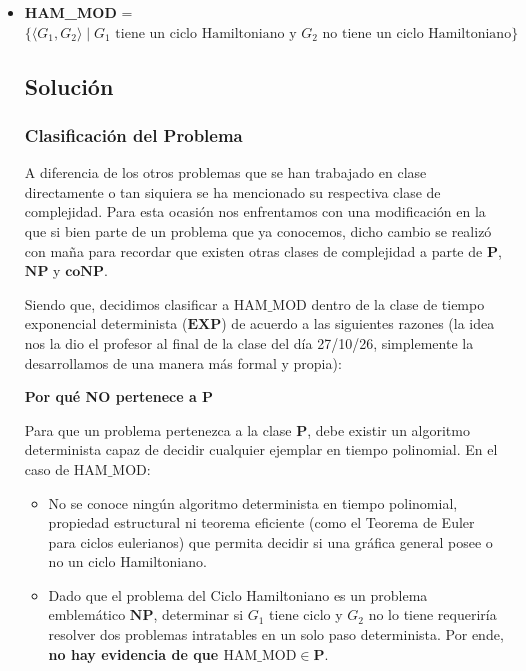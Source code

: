 \begin{itemize}[leftmargin=*]
    Como $L \in \mathbf{P}$, se puede usar el algoritmo determinista $M$ como un verificador trivial que ignora cualquier certificado, lo que demuestra que \textbf{$L \in \mathbf{NP}$}.

    Por otra parte, al ser $\mathbf{P}$ cerrada bajo complemento ($\mathbf{P} = \text{co}\mathbf{P}$), el complemento de $L$ también está en $\mathbf{P}$, lo que implica directamente que \textbf{$L \in \mathbf{coNP}$}.

    \vspace{0.5cm}
    \item \textbf{HAM\_MOD} = $\{ \langle G_1, G_2 \rangle \mid G_1 \text{ tiene un ciclo Hamiltoniano y } G_2 \text{ no tiene un ciclo Hamiltoniano} \}$
    
    \subsection*{Solución}
    \subsubsection*{Clasificación del Problema}

    A diferencia de los otros problemas que se han trabajado en clase directamente o tan siquiera se ha mencionado su respectiva clase de complejidad. Para esta ocasión nos enfrentamos con una modificación en la que si bien parte de un problema que ya conocemos, dicho cambio se realizó con maña para recordar que existen otras clases de complejidad a parte de $\mathbf{P}$, $\mathbf{NP}$ y $\mathbf{coNP}$.

    Siendo que, decidimos clasificar a $\text{HAM\_MOD}$ dentro de la clase de tiempo exponencial determinista ($\mathbf{EXP}$) de acuerdo a las siguientes razones (la idea nos la dio el profesor al final de la clase del día 27/10/26, simplemente la desarrollamos de una manera más formal y propia):

    \vspace{0.3cm}
    \noindent\textbf{Por qué NO pertenece a $\mathbf{P}$}

    Para que un problema pertenezca a la clase $\mathbf{P}$, debe existir un algoritmo determinista capaz de decidir cualquier ejemplar en tiempo polinomial. En el caso de $\text{HAM\_MOD}$:
    \begin{itemize}[leftmargin=*]
        \item No se conoce ningún algoritmo determinista en tiempo polinomial, propiedad estructural ni teorema eficiente (como el Teorema de Euler para ciclos eulerianos) que permita decidir si una gráfica general posee o no un ciclo Hamiltoniano.
        \item Dado que el problema del Ciclo Hamiltoniano es un problema emblemático $\mathbf{NP}$, determinar si $G_1$ tiene ciclo y $G_2$ no lo tiene requeriría resolver dos problemas intratables en un solo paso determinista. Por ende, \textbf{no hay evidencia de que $\text{HAM\_MOD} \in \mathbf{P}$}.
    \end{itemize}


\end{itemize}

